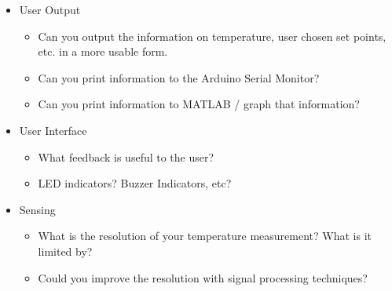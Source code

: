 \documentclass[10pt]{report}
\begin{document}
\begin{itemize}
\item User Output
	\begin{itemize}
	\item Can you output the information on temperature, user chosen set points, etc. in a more usable form. 
	\item Can you print information to the Arduino Serial Monitor?
	\item Can you print information to MATLAB / graph that information?
	\end{itemize}
\item User Interface
	\begin{itemize}
	\item What feedback is useful to the user?
	\item LED indicators? Buzzer Indicators, etc?
	\end{itemize}
\item Sensing
	\begin{itemize}
	\item What is the resolution of your temperature measurement? What is it limited by?
	\item Could you improve the resolution with signal processing techniques? 
	\end{itemize}
\end{itemize}
\end{document}
